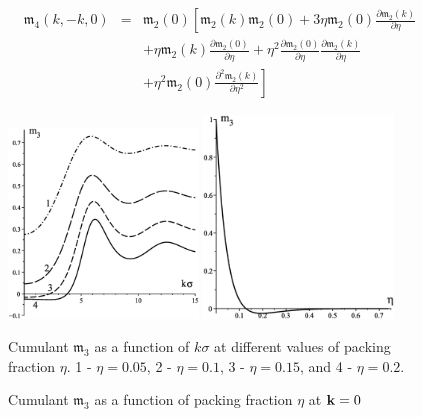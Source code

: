 \begin{eqnarray}
	\label{recur_m4_m2}
	\mathfrak{m}_4(k, -k, 0) &=& \mathfrak{m}_2(0) 
	\left[
	\mathfrak{m}_2(k)\mathfrak{m}_2(0) + 3\eta\mathfrak{m}_2(0)\frac{\partial\mathfrak{m}_2(k)}{\partial\eta}
	\right.
	\nonumber\\
	&& \left. 
	+ \eta\mathfrak{m}_2(k)\frac{\partial\mathfrak{m}_2(0)}{\partial\eta} 
	+ \eta^2\frac{\partial\mathfrak{m}_2(0)}{\partial\eta} \frac{\partial\mathfrak{m}_2(k)}{\partial\eta}
	\right.
	\nonumber\\
	&& \left.
	+ \eta^2\mathfrak{m}_2(0)\frac{\partial^2\mathfrak{m}_2(k)}{\partial\eta^2}
	\right]
\end{eqnarray}

\begin{figure}[htbp]
	\includegraphics[width=0.45\textwidth,angle=0]{M3_as_function_of_k_at_different_eta} \hfill
	\includegraphics[width=0.45\textwidth,angle=0]{M3_as_function_of_eta_at_k_equals_0} \\
	\parbox{0.5\textwidth}{\caption{\label{m3_vs_k} Cumulant $\mathfrak{m}_3$ as a function of $k\sigma$ at different values of packing fraction $\eta$. 1 - $\eta = 0.05$, 2 - $\eta=0.1$, 3 - $\eta = 0.15$, and 4 - $\eta=0.2$.
	}} \hfill
	\parbox{0.45\textwidth}{\caption{\label{m3_vs_eta} Cumulant $\mathfrak{m}_3$ as a function of packing fraction $\eta$ at $\vb k = 0$
	}}
\end{figure}
